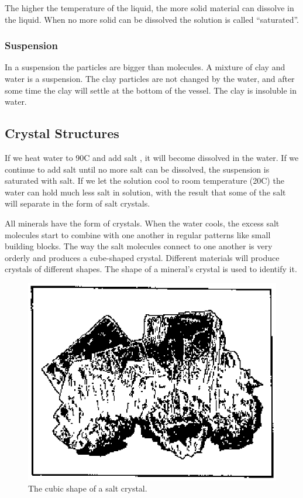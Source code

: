 The higher the temperature of the liquid, the more solid material can dissolve 
in the liquid. When no more solid can be dissolved the solution is called 
``saturated''.
\subsubsection{Suspension}
In a suspension the particles are bigger than molecules. A mixture of clay and 
water is a suspension. The clay particles are not changed by the water, and 
after some time the clay will settle at the bottom of the vessel. The clay is 
insoluble in water.
\subsection{Crystal Structures}
If we heat water to 90\degree C and add salt , it will become 
dissolved in the water. If we continue to add salt until no more salt can be 
dissolved, the suspension is saturated with salt. If we let the solution cool 
to room temperature (20\degree C) the water can hold much less salt in 
solution, with the result that some of the salt will separate in the form of 
salt crystals.

All minerals have the form of crystals. When the water cools, the excess salt 
molecules start to combine with one another in regular patterns like small 
building blocks. The way the salt molecules connect to one another is very 
orderly and produces a cube-shaped crystal. Different materials will produce 
crystals of different shapes. The shape of a mineral's crystal is used to 
identify it.
\begin{figure}[htbp!]
\centering
\includegraphics[width=0.5\linewidth]{img/salt.eps}
\caption{The cubic shape of a salt crystal.}
\label{fig:salt}
\end{figure}
